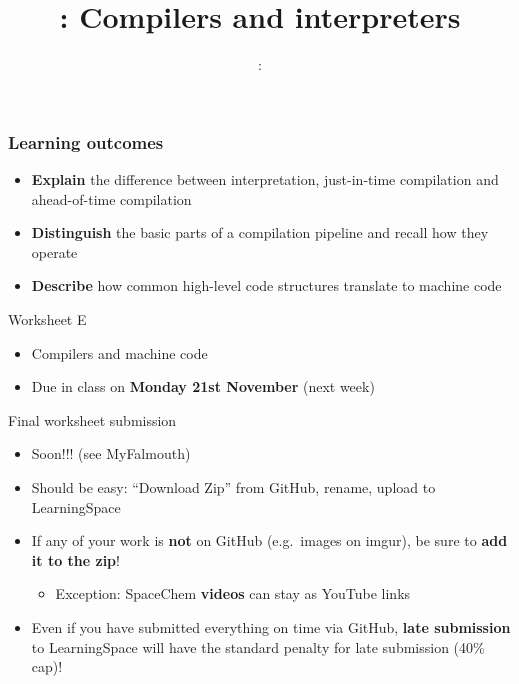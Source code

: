 \usepackage{../../beamerthemeFalmouthGamesAcademy}
\usepackage{multimedia}
\graphicspath{ {../../} }

\usepackage{mips}

\usepackage[normalem]{ulem}
\usepackage{wasysym}

\usepackage{pdfpages}

\usetikzlibrary{arrows,automata}




\title{\sessionnumber: Compilers and interpreters}
\subtitle{\modulecode: \moduletitle}

\frame{\titlepage} 

\begin{frame}
	\frametitle{Learning outcomes}
	\begin{itemize}
		\item \textbf{Explain} the difference between interpretation, just-in-time compilation and ahead-of-time compilation
		\item \textbf{Distinguish} the basic parts of a compilation pipeline and recall how they operate
		\item \textbf{Describe} how common high-level code structures translate to machine code
	\end{itemize}
\end{frame}

\begin{frame}{Worksheet E}
	\begin{itemize}
		\item Compilers and machine code
		\item Due in class on \textbf{Monday 21st November} (next week)
	\end{itemize}
\end{frame}

\begin{frame}{Final worksheet submission}
	\begin{itemize}
		\item Soon!!! (see MyFalmouth)
		\item Should be easy: ``Download Zip'' from GitHub, rename, upload to LearningSpace
		\item If any of your work is \textbf{not} on GitHub (e.g.\ images on imgur), be sure to \textbf{add it to the zip}!
			\begin{itemize}
				\item Exception: SpaceChem \textbf{videos} can stay as YouTube links
			\end{itemize}
		\item Even if you have submitted everything on time via GitHub,
			\textbf{late submission} to LearningSpace will have the standard penalty for late submission (40\% cap)!
	\end{itemize}
\end{frame}








